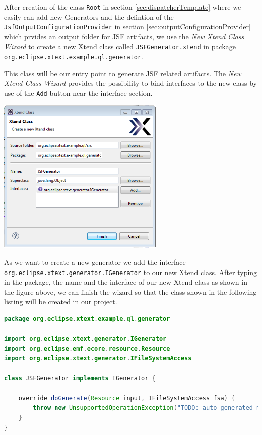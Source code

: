 After creation of the class \texttt{Root} in section
\ref{sec:dispatcherTemplate} where we easily can
add new Generators and the defintion of the
\texttt{JsfOutputConfigurationProvider} in section \ref{sec:outputConfigurationProvider}
which prvides an output folder for JSF
artifacts, we use the \emph{New Xtend Class Wizard} to create a new Xtend class
called \texttt{JSFGenerator.xtend} in package \texttt{org.eclipse.xtext.example.ql.generator}.

This class will be our entry point to generate JSF related artifacts. The
\emph{New Xtend Class Wizard} provides the possibility to bind interfaces to the
new class by use of the \texttt{Add} button near the interface section.

\begin{center}
\includegraphics[width=8cm]{./images/chapter02/newXtendClassWizard.png}
\end{center}

As we want to create a new generator we add the interface
\texttt{org.eclipse.xtext.generator.IGenerator} to our new Xtend class.
After typing in the package, the name and the interface of our new Xtend class
as shown in the figure above, we can finish the
wizard so that the class shown in the following listing
will be created in our project.

\begin{lstlisting}[language=Java] 
package org.eclipse.xtext.example.ql.generator

import org.eclipse.xtext.generator.IGenerator
import org.eclipse.emf.ecore.resource.Resource
import org.eclipse.xtext.generator.IFileSystemAccess

class JSFGenerator implements IGenerator {
	
	override doGenerate(Resource input, IFileSystemAccess fsa) {
		throw new UnsupportedOperationException("TODO: auto-generated method stub")
	}
}
\end{lstlisting}

